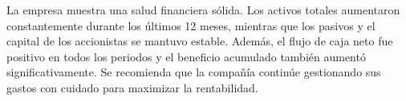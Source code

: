 

La empresa muestra una salud financiera sólida. Los activos totales aumentaron constantemente durante los últimos 12 meses, mientras que los pasivos y el capital de los accionistas se mantuvo estable. Además, el flujo de caja neto fue positivo en todos los periodos y el beneficio acumulado también aumentó significativamente. Se recomienda que la compañía continúe gestionando sus gastos con cuidado para maximizar la rentabilidad.